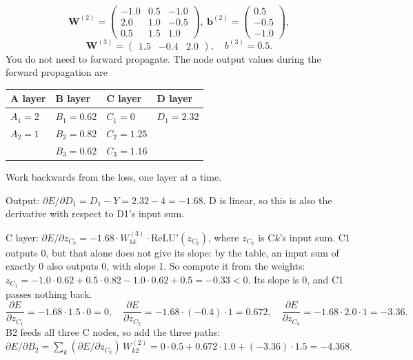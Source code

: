 \documentclass[11pt,addpoints]{exam}
\begin{document}
\begin{questions}
\begin{parts}
\[\bm{W}^{(2)} = \begin{pmatrix} -1.0 & 0.5 & -1.0 \\ 2.0 & 1.0 & -0.5 \\ 0.5 & 1.5 & 1.0 \end{pmatrix},\
\bm{b}^{(2)} = \begin{pmatrix} 0.5 \\ -0.5 \\ -1.0 \end{pmatrix},
\]
\[
\bm{W}^{(3)} = \begin{pmatrix} 1.5 & -0.4 & 2.0 \end{pmatrix},\quad b^{(3)} = 0.5 .
\]
You do not need to forward propagate. The node output values during the forward propagation are
\begin{center}
\begin{tabular}{|l|l|l|l|}
\hline
\rowcolor{headgray} A layer & B layer & C layer & D layer \\ \hline
$A_1 = 2$ & $B_1 = 0.62$ & $C_1 = 0$ & $D_1 = 2.32$ \\ \hline
$A_2 = 1$ & $B_2 = 0.82$ & $C_2 = 1.25$ & \\ \hline
& $B_3 = 0.62$ & $C_3 = 1.16$ & \\ \hline
\end{tabular}
\end{center}
\answerbox{24}
\begin{solution}
Work backwards from the loss, one layer at a time.

Output: $\partial E/\partial D_1 = D_1 - Y = 2.32 - 4 = -1.68$. D is linear, so this is also the
derivative with respect to D1's input sum.

C layer: $\partial E/\partial z_{C_k} = -1.68 \cdot W^{(3)}_{1k} \cdot \mathrm{ReLU}'(z_{C_k})$, where $z_{C_k}$ is
C$k$'s input sum. C1 outputs 0, but that alone does not give its slope: by the table, an input sum of
exactly 0 also outputs 0, with slope 1. So compute it from the weights:
$z_{C_1} = -1.0 \cdot 0.62 + 0.5 \cdot 0.82 - 1.0 \cdot 0.62 + 0.5 = -0.33 < 0$. Its slope is 0, and C1 passes nothing back.
\[
\frac{\partial E}{\partial z_{C_1}} = -1.68 \cdot 1.5 \cdot 0 = 0, \quad
\frac{\partial E}{\partial z_{C_2}} = -1.68 \cdot (-0.4) \cdot 1 = 0.672, \quad
\frac{\partial E}{\partial z_{C_3}} = -1.68 \cdot 2.0 \cdot 1 = -3.36 .
\]
B2 feeds all three C nodes, so add the three paths:
$\partial E/\partial B_2 = \sum_k (\partial E/\partial z_{C_k})\, W^{(2)}_{k2} = 0 \cdot 0.5 + 0.672 \cdot 1.0 + (-3.36) \cdot 1.5 = -4.368$.


\end{solution}
\end{parts}
\end{questions}
\end{document}
